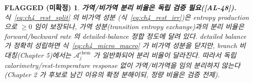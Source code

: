 \documentclass[11pt,a4paper]{article}
\newtheorem*{flagbox}{FLAGGED (미확정)}
\newcommand{\chem}{\mathrm{chem}}
\newcommand{\AL}[1]{\textsf{[AL-#1]}}
\begin{document}
\begin{flagbox}
\textbf{가역/비가역 분리 비율은 독립 검증 필요(\AL{48}).} 식~\eqref{eq:ch4_rest_split} 의 비가역 성분
(식~\eqref{eq:ch4_rest_irr})은 entropy production 으로 $\ge0$ 임이 보장되나, 가역 성분(transition entropy
exchange)과의 \emph{분리 비율}은 forward/backward rate 의 detailed-balance 정합 정도에 달려 있다. detailed
balance 가 정확히 성립하면 식~\eqref{eq:ch4_micro_macro} 가 비가역 성분을 닫지만, branch 비대칭(Chapter 5)에서는
$\mathcal A_j^{\chem}$ 가 일반화되어 분리 비율이 달라진다. 따라서 독립 calorimetry/rest-temperature response
없이 가역/비가역을 임의 분리하지 않는다(Chapter 2 가 후보로 남긴 이유의 확정 분해이되, \emph{정량} 비율은
검증 전제).
\end{flagbox}

\end{document}
